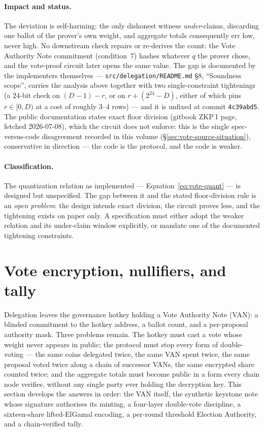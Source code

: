 \documentclass[11pt,a4paper]{article}
\theoremstyle{definition}
\begin{document}
\paragraph{Impact and status.} The deviation is self-harming: the only
dishonest witness \emph{under}-claims, discarding one ballot of the
prover's own weight, and aggregate totals consequently err low, never
high. No downstream check repairs or re-derives the count: the Vote
Authority Note commitment (condition~7) hashes whatever $q$ the prover
chose, and the vote-proof circuit later opens the same value. The gap is
documented by the implementers themselves ---
\texttt{src/delegation/README.md} \S8, ``Soundness scope'', carries the
analysis above together with two single-constraint tightenings (a
$24$-bit check on $(D - 1) - r$, or on $r + (2^{24} - D)$, either of
which pins $r \in [0, D)$ at a cost of roughly $3$--$4$ rows) --- and it
is unfixed at commit \texttt{4c39abd5}. The public documentation states
exact floor division (gitbook ZKP\,1 page, fetched 2026-07-08), which the
circuit does not enforce: this is the single spec-versus-code
disagreement recorded in this volume
(\S\ref{sec:vote-source-situation}), conservative in direction --- the
code is the protocol, and the code is weaker.

\paragraph{Classification.} The quantization relation as implemented ---
Equation~\eqref{eq:vote-quant} --- is designed but unspecified. The gap
between it and the stated floor-division rule is an
\emph{open problem}: the design intends exact division, the circuit
proves less, and the tightening exists on paper only. A specification
must either adopt the weaker relation and its under-claim window
explicitly, or mandate one of the documented tightening constraints.

\section{Vote encryption, nullifiers, and tally}\label{sec:vote-tally}

Delegation leaves the governance hotkey holding a Vote Authority Note (VAN): a
blinded commitment to the hotkey address, a ballot count, and a per-proposal
authority mask. Three problems remain. The hotkey must cast a vote whose
weight never appears in public; the protocol must stop every form of
double-voting --- the same coins delegated twice, the same VAN spent twice,
the same proposal voted twice along a chain of successor VANs, the same
encrypted share counted twice; and the aggregate totals must become public in
a form every chain node verifies, without any single party ever holding the
decryption key. This section develops the answers in order: the VAN itself,
the synthetic keystone note whose signature authorises its minting, a
four-layer double-vote discipline, a sixteen-share lifted-ElGamal encoding, a
per-round threshold Election Authority, and a chain-verified tally.
\end{document}
